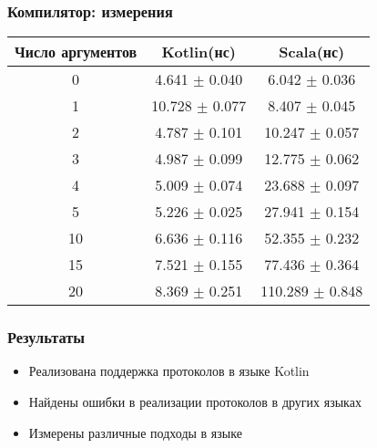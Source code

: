 \documentclass{beamer}
\begin{document}
\begin{frame}\frametitle{Компилятор: измерения}

\begin{table}[h]
\begin{tabular}{|c|c|c|} \hline
Число аргументов & Kotlin(нс) & Scala(нс) \\ \hline
0 & 4.641 $\pm$ 0.040 & 6.042 $\pm$ 0.036 \\ \hline
1 & 10.728 $\pm$ 0.077 & 8.407 $\pm$ 0.045 \\ \hline
2 & 4.787 $\pm$ 0.101 & 10.247 $\pm$ 0.057 \\ \hline
3 & 4.987 $\pm$ 0.099 & 12.775 $\pm$ 0.062 \\ \hline
4 & 5.009 $\pm$ 0.074 & 23.688 $\pm$ 0.097 \\ \hline
5 & 5.226 $\pm$ 0.025 & 27.941 $\pm$ 0.154 \\ \hline
10 & 6.636 $\pm$ 0.116 & 52.355 $\pm$ 0.232 \\ \hline
15 & 7.521 $\pm$ 0.155 & 77.436 $\pm$ 0.364 \\ \hline
20 & 8.369 $\pm$ 0.251 & 110.289 $\pm$ 0.848 \\ \hline
\end{tabular}
\end{table}
\end{frame}

\begin{frame}\frametitle{Результаты}
\begin{itemize}
    \item Реализована поддержка протоколов в языке Kotlin
    \item Найдены ошибки в реализации протоколов в других языках
    \item Измерены различные подходы в языке
\end{itemize}
\end{frame}
\end{document}
